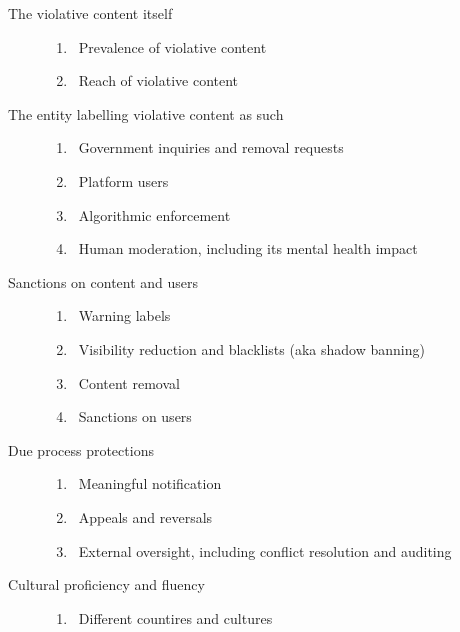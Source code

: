 
\begin{description}
\item[The violative content itself]\hfill
    \begin{enumerate}
        \item {}~Prevalence of violative content
        \item {}~Reach of violative content
    \end{enumerate}
\item[The entity labelling violative content as such]\hfill
    \begin{enumerate}[resume]
        \item {}~Government inquiries and removal requests
        \item {}~Platform users
        \item {}~Algorithmic enforcement
        \item {}~Human moderation, including its mental health impact
    \end{enumerate}
\item[Sanctions on content and users]\hfill
    \begin{enumerate}[resume]
        \item {}~Warning labels
        \item {}~Visibility reduction and blacklists (aka shadow banning)
        \item {}~Content removal
        \item {}~Sanctions on users
    \end{enumerate}
\item[Due process protections]\hfill
    \begin{enumerate}[resume]
        \item {}~Meaningful notification
        \item {}~Appeals and reversals
        \item {}~External oversight, including conflict resolution and auditing
    \end{enumerate}
\item[Cultural proficiency and fluency]\hfill
    \begin{enumerate}[resume]
        \item {}~Different countires and cultures
    \end{enumerate}
\end{description}

